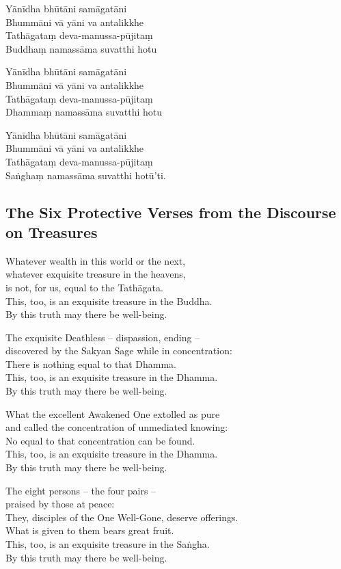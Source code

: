 \begin{paritta}
Yānīdha bhūtāni samāgatāni\\
Bhummāni vā yāni va antalikkhe\\
Tathāgataṃ deva-manussa-pūjitaṃ\\
Buddhaṃ namassāma suvatthi hotu

Yānīdha bhūtāni samāgatāni\\
Bhummāni vā yāni va antalikkhe\\
Tathāgataṃ deva-manussa-pūjitaṃ\\
Dhammaṃ namassāma suvatthi hotu

Yānīdha bhūtāni samāgatāni\\
Bhummāni vā yāni va antalikkhe\\
Tathāgataṃ deva-manussa-pūjitaṃ\\
Saṅghaṃ namassāma suvatthi hotū'ti. 

\end{paritta}

\subsection{The Six Protective Verses from the Discourse on Treasures}

Whatever wealth in this world or the next,\\
whatever exquisite treasure in the heavens,\\
is not, for us, equal to the Tathāgata.\\
This, too, is an exquisite treasure in the Buddha.\\
By this truth may there be well-being.

The exquisite Deathless -- dispassion, ending --\\
discovered by the Sakyan Sage while in concentration:\\
There is nothing equal to that Dhamma.\\
This, too, is an exquisite treasure in the Dhamma.\\
By this truth may there be well-being.

What the excellent Awakened One extolled as pure\\
and called the concentration of unmediated knowing:\\
No equal to that concentration can be found.\\
This, too, is an exquisite treasure in the Dhamma.\\
By this truth may there be well-being.

The eight persons -- the four pairs --\\
praised by those at peace:\\
They, disciples of the One Well-Gone, deserve offerings.\\
What is given to them bears great fruit.\\
This, too, is an exquisite treasure in the Saṅgha.\\
By this truth may there be well-being.


